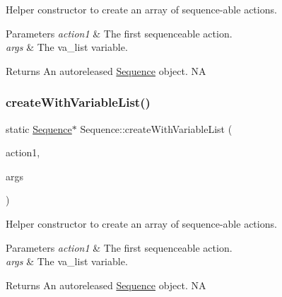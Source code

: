 Helper constructor to create an array of sequence-\/able actions.


\begin{DoxyParams}{Parameters}
{\em action1} & The first sequenceable action. \\
\hline
{\em args} & The va\+\_\+list variable. \\
\hline
\end{DoxyParams}
\begin{DoxyReturn}{Returns}
An autoreleased \hyperlink{classSequence}{Sequence} object.  NA 
\end{DoxyReturn}
\mbox{\label{classSequence_afb4fccce4105b654a71ec37d73cc6f6c}} 
\subsubsection{\texorpdfstring{create\+With\+Variable\+List()}{createWithVariableList()}\hspace{0.1cm}{\footnotesize\ttfamily [2/2]}}
{\footnotesize\ttfamily static \hyperlink{classSequence}{Sequence}$\ast$ Sequence\+::create\+With\+Variable\+List (\begin{DoxyParamCaption}\item[{\hyperlink{classFiniteTimeAction}{Finite\+Time\+Action} $\ast$}]{action1,  }\item[{va\+\_\+list}]{args }\end{DoxyParamCaption})\hspace{0.3cm}{\ttfamily [static]}}

Helper constructor to create an array of sequence-\/able actions.


\begin{DoxyParams}{Parameters}
{\em action1} & The first sequenceable action. \\
\hline
{\em args} & The va\+\_\+list variable. \\
\hline
\end{DoxyParams}
\begin{DoxyReturn}{Returns}
An autoreleased \hyperlink{classSequence}{Sequence} object.  NA 
\end{DoxyReturn}
\mbox{\label{classSequence_ae4324a26f6f238fd448ff7261e5f7c5e}} 
